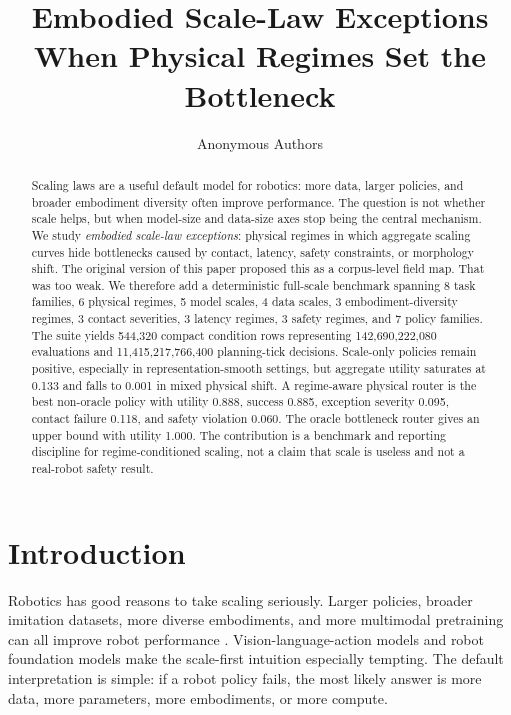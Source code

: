 \documentclass{article}
\title{Embodied Scale-Law Exceptions\\When Physical Regimes Set the Bottleneck}
\author{Anonymous Authors}
\begin{document}
\maketitle

\begin{abstract}
Scaling laws are a useful default model for robotics: more data, larger policies, and broader embodiment diversity often improve performance. The question is not whether scale helps, but when model-size and data-size axes stop being the central mechanism. We study \emph{embodied scale-law exceptions}: physical regimes in which aggregate scaling curves hide bottlenecks caused by contact, latency, safety constraints, or morphology shift. The original version of this paper proposed this as a corpus-level field map. That was too weak. We therefore add a deterministic full-scale benchmark spanning 8 task families, 6 physical regimes, 5 model scales, 4 data scales, 3 embodiment-diversity regimes, 3 contact severities, 3 latency regimes, 3 safety regimes, and 7 policy families. The suite yields 544,320 compact condition rows representing 142,690,222,080 evaluations and 11,415,217,766,400 planning-tick decisions. Scale-only policies remain positive, especially in representation-smooth settings, but aggregate utility saturates at 0.133 and falls to 0.001 in mixed physical shift. A regime-aware physical router is the best non-oracle policy with utility 0.888, success 0.885, exception severity 0.095, contact failure 0.118, and safety violation 0.060. The oracle bottleneck router gives an upper bound with utility 1.000. The contribution is a benchmark and reporting discipline for regime-conditioned scaling, not a claim that scale is useless and not a real-robot safety result.
\end{abstract}

\section{Introduction}

Robotics has good reasons to take scaling seriously. Larger policies, broader imitation datasets, more diverse embodiments, and more multimodal pretraining can all improve robot performance \citep{neural_scaling_robotics,data_scaling_il,embodiment_scaling_locomotion}. Vision-language-action models and robot foundation models make the scale-first intuition especially tempting. The default interpretation is simple: if a robot policy fails, the most likely answer is more data, more parameters, more embodiments, or more compute.
\end{document}
